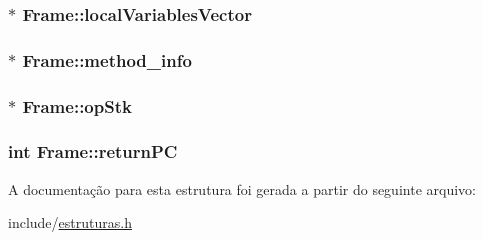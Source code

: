 \subsubsection[{\texorpdfstring{local\+Variables\+Vector}{localVariablesVector}}]{$\ast$ Frame\+::local\+Variables\+Vector}\hypertarget{struct_frame_a17cc84db651051b7d067f14eebe7c8b6}{}\label{struct_frame_a17cc84db651051b7d067f14eebe7c8b6}
\subsubsection[{\texorpdfstring{method\+\_\+info}{method_info}}]{$\ast$ Frame\+::method\+\_\+info}\hypertarget{struct_frame_a4dbf8107ea01f748582bb060aa299628}{}\label{struct_frame_a4dbf8107ea01f748582bb060aa299628}
\subsubsection[{\texorpdfstring{op\+Stk}{opStk}}]{$\ast$ Frame\+::op\+Stk}\hypertarget{struct_frame_a0cd2446df36707c236ffaf43844d387a}{}\label{struct_frame_a0cd2446df36707c236ffaf43844d387a}
\subsubsection[{\texorpdfstring{return\+PC}{returnPC}}]{\setlength{\rightskip}{0pt plus 5cm}int Frame\+::return\+PC}\hypertarget{struct_frame_a0f431de4c352b8c9a170a8e74d7c3a15}{}\label{struct_frame_a0f431de4c352b8c9a170a8e74d7c3a15}


A documentação para esta estrutura foi gerada a partir do seguinte arquivo\+:\begin{DoxyCompactItemize}
\item 
include/\hyperlink{estruturas_8h}{estruturas.\+h}\end{DoxyCompactItemize}
